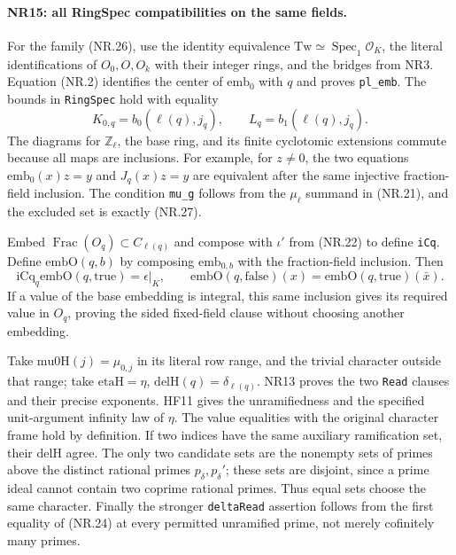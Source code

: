 \paragraph{NR15: all RingSpec compatibilities on the same fields.}
For the family (NR.26), use the identity equivalence
$\mathrm{Tw}\simeq\operatorname{Spec}_1\mathcal O_K$, the literal
identifications of $O_0,O,O_k$ with their integer rings, and the
bridges from NR3. Equation (NR.2) identifies the center of
$\mathrm{emb}_0$ with $q$ and proves \texttt{pl\_emb}.
The bounds in \texttt{RingSpec} hold with equality
\[
        K_{0,q}=b_0(\ell(q),j_q),\qquad
                   L_q=b_1(\ell(q),j_q).              \tag{NR.28}
\]
The diagrams for $\mathbb Z_\ell$, the base ring, and its finite
cyclotomic extensions commute because all maps are inclusions.
For example, for $z\ne0$, the two equations
$\mathrm{emb}_0(x)z=y$ and $J_q(x)z=y$ are equivalent after
the same injective fraction-field inclusion. The condition
\texttt{mu\_g} follows from the $\mu_\ell$ summand in (NR.21),
and the excluded set is exactly (NR.27).

Embed $\operatorname{Frac}(O_q)\subset C_{\ell(q)}$ and compose
with $\iota'$ from (NR.22) to define \texttt{iCq}. Define
$\mathrm{embO}(q,b)$ by composing $\mathrm{emb}_{0,b}$ with the
fraction-field inclusion. Then
\[
 \mathrm{iCq}_q\mathrm{embO}(q,\mathrm{true})=\epsilon|_K,\qquad
 \mathrm{embO}(q,\mathrm{false})(x)
                   =\mathrm{embO}(q,\mathrm{true})(\bar x).
                                                               \tag{NR.29}
\]
If a value of the base embedding is integral, this same inclusion
gives its required value in $O_q$, proving the sided fixed-field
clause without choosing another embedding.

Take $\mathrm{mu0H}(j)=\mu_{0,j}$ in its literal row range, and
the trivial character outside that range; take
$\mathrm{etaH}=\eta$, $\mathrm{delH}(q)=\delta_{\ell(q)}$.
NR13 proves the two \texttt{Read} clauses and their precise
exponents. HF11 gives the unramifiedness and the specified
unit-argument infinity law of $\eta$. The value equalities with
the original character frame hold by definition.
If two indices have the same auxiliary ramification set, their
$\mathrm{delH}$ agree. The only two candidate sets are the
nonempty sets of primes above the distinct rational primes
$p_\delta,p_\delta'$; these sets are disjoint, since a prime ideal
cannot contain two coprime rational primes. Thus equal sets
choose the same character. Finally the stronger
\texttt{deltaRead} assertion follows from the first equality
of (NR.24) at every permitted unramified prime, not merely
cofinitely many primes.

